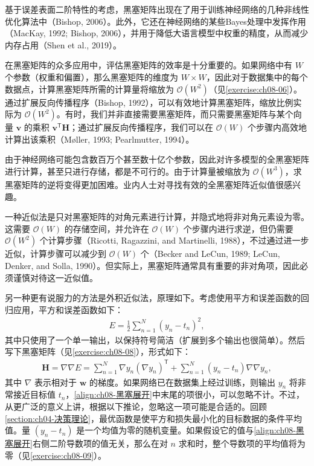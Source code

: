 \documentclass[../../main.tex]{subfiles}
\begin{document}
基于误差表面二阶特性的考虑，黑塞矩阵出现在了用于训练神经网络的几种非线性优化算法中（Bishop, 2006）。此外，它还在神经网络的某些Bayes处理中发挥作用（MacKay, 1992; Bishop, 2006），并用于降低大语言模型中权重的精度，从而减少内存占用（Shen et al., 2019）。

在黑塞矩阵的众多应用中，评估黑塞矩阵的效率是十分重要的。如果网络中有 $W$ 个参数（权重和偏置），那么黑塞矩阵的维度为 $W\times W$，因此对于数据集中的每个数据点，计算黑塞矩阵所需的计算量将缩放为 $\mathcal{O}(W^{2})$（见\cref{exercise:ch08-06}）。通过扩展反向传播程序（Bishop, 1992），可以有效地计算黑塞矩阵，缩放比例实际为 $\mathcal{O}(W^{2})$。有时，我们并非直接需要黑塞矩阵，而只需要黑塞矩阵与某个向量 $\mathbf{v}$ 的乘积 $\mathbf{v}^{\mathsf T}\mathbf{H}$；通过扩展反向传播程序，我们可以在 $\mathcal{O}(W)$ 个步骤内高效地计算出该乘积（Møller, 1993; Pearlmutter, 1994）。

由于神经网络可能包含数百万个甚至数十亿个参数，因此对许多模型的全黑塞矩阵进行计算，甚至只进行存储，都是不可行的。由于计算量被缩放为 $\mathcal{O}(W^{3})$，求黑塞矩阵的逆将变得更加困难。业内人士对寻找有效的全黑塞矩阵近似值很感兴趣。

一种近似法是只对黑塞矩阵的对角元素进行计算，并隐式地将非对角元素设为零。这需要 $\mathcal{O}(W)$ 的存储空间，并允许在 $\mathcal{O}(W)$ 个步骤内进行求逆，但仍需要 $\mathcal{O}(W^{2})$ 个计算步骤（Ricotti, Ragazzini, and Martinelli, 1988），不过通过进一步近似，计算步骤可以减少到 $\mathcal{O}(W)$ 个（Becker and LeCun, 1989; LeCun, Denker, and Solla, 1990）。但实际上，黑塞矩阵通常具有重要的非对角项，因此必须谨慎对待这一近似值。

另一种更有说服力的方法是外积近似法，原理如下。考虑使用平方和误差函数的回归应用，平方和误差函数如下：
\begin{align}
E=\frac{1}{2}\sum_{n=1}^{N}\left(y_n-t_n\right)^{2},
\label{align:ch08-平方和误差}
\end{align}
其中只使用了一个单一输出，以保持符号简洁（扩展到多个输出也很简单）。然后写下黑塞矩阵（见\cref{exercise:ch08-08}），形式如下：
\begin{align}
\mathbf{H}=\nabla\nabla E=\sum_{n=1}^{N}\nabla y_n\left(\nabla y_n\right)^{\mathsf T}+\sum_{n=1}^{N}\left(y_n-t_n\right)\nabla\nabla y_n,
\label{align:ch08-黑塞展开}
\end{align}
其中 $\nabla$ 表示相对于 $\mathbf{w}$ 的梯度。如果网络已在数据集上经过训练，则输出 $y_n$ 将非常接近目标值 $t_n$，\eqref{align:ch08-黑塞展开}中末尾的项很小，可以忽略不计。不过，从更广泛的意义上讲，根据以下推论，忽略这一项可能是合适的。回顾\cref{section:ch04-决策理论}，最优函数是使平方和损失最小化的目标数据的条件平均值。量 $(y_n-t_n)$ 是一个均值为零的随机变量。如果假设它的值与\eqref{align:ch08-黑塞展开}右侧二阶导数项的值无关，那么在对 $n$ 求和时，整个导数项的平均值将为零（见\cref{exercise:ch08-09}）。
\end{document}
